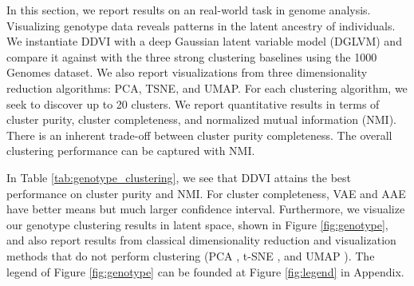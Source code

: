 \documentclass[letterpaper]{article} %
\begin{document}

In this section, we report results on an real-world task in genome analysis. Visualizing genotype data reveals patterns in the latent ancestry of individuals. 
We instantiate DDVI with a deep Gaussian latent variable model (DGLVM) and compare it against with the three strong clustering baselines using the 1000 Genomes dataset. 
We also report visualizations from three dimensionality reduction algorithms: PCA, TSNE, and UMAP.
For each clustering algorithm, we seek to discover up to 20 clusters. We report quantitative results in terms of cluster purity, cluster completeness, and normalized mutual information (NMI). There is an inherent trade-off between cluster purity completeness. The overall clustering performance can be captured with NMI. 

In Table \ref{tab:genotype_clustering}, we see that DDVI attains the best performance on cluster purity and NMI. For cluster completeness, VAE and AAE have better means but much larger confidence interval.
Furthermore, we visualize our genotype clustering results in latent space, shown in Figure \ref{fig:genotype}, and also report results from classical dimensionality reduction and visualization methods that do not perform clustering (PCA \citep{wold1987principal}, t-SNE \citep{van2008visualizing}, and UMAP \citep{mcinnes2018umap}). The legend of Figure \ref{fig:genotype} can be founded at Figure \ref{fig:legend} in Appendix.

\end{document}
